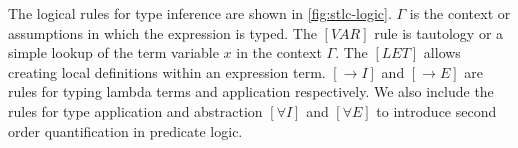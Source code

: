The logical rules for type inference are shown in \ref{fig:stlc-logic}. $\Gamma$ is the
context or assumptions in which the expression is typed. The $[VAR]$ rule is tautology or a simple
lookup of the term variable $x$ in the context $\Gamma$. The $[LET]$ allows creating local
definitions within an expression term. $[\rightarrow I]$ and $[\rightarrow E]$ are rules
for typing lambda terms and application respectively. We also include the rules for
type application and abstraction $[\forall I]$ and $[\forall E]$ to introduce second order
quantification in predicate logic.



